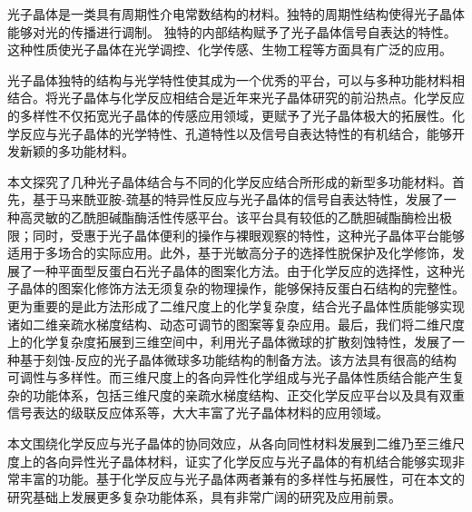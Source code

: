 \begin{cabstract}
  光子晶体是一类具有周期性介电常数结构的材料。独特的周期性结构使得光子晶体能够对光的传播进行调制。
  独特的内部结构赋予了光子晶体信号自表达的特性。这种性质使光子晶体在光学调控、化学传感、生物工程等方面具有广泛的应用。

  光子晶体独特的结构与光学特性使其成为一个优秀的平台，可以与多种功能材料相结合。将光子晶体与化学反应相结合是近年来光子晶体研究的前沿热点。化学反应的多样性不仅拓宽光子晶体的传感应用领域，更赋予了光子晶体极大的拓展性。化学反应与光子晶体的光学特性、孔道特性以及信号自表达特性的有机结合，能够开发新颖的多功能材料。

  本文探究了几种光子晶体结合与不同的化学反应结合所形成的新型多功能材料。首先，基于马来酰亚胺-巯基的特异性反应与光子晶体的信号自表达特性，发展了一种高灵敏的乙酰胆碱酯酶活性传感平台。该平台具有较低的乙酰胆碱酯酶检出极限；同时，受惠于光子晶体便利的操作与裸眼观察的特性，这种光子晶体平台能够适用于多场合的实际应用。此外，基于光敏高分子的选择性脱保护及化学修饰，发展了一种平面型反蛋白石光子晶体的图案化方法。由于化学反应的选择性，这种光子晶体的图案化修饰方法无须复杂的物理操作，能够保持反蛋白石结构的完整性。更为重要的是此方法形成了二维尺度上的化学复杂度，结合光子晶体性质能够实现诸如二维亲疏水梯度结构、动态可调节的图案等复杂应用。最后，我们将二维尺度上的化学复杂度拓展到三维空间中，利用光子晶体微球的扩散刻蚀特性，发展了一种基于刻蚀-反应的光子晶体微球多功能结构的制备方法。该方法具有很高的结构可调性与多样性。而三维尺度上的各向异性化学组成与光子晶体性质结合能产生复杂的功能体系，包括三维尺度的亲疏水梯度结构、正交化学反应平台以及具有双重信号表达的级联反应体系等，大大丰富了光子晶体材料的应用领域。

  本文围绕化学反应与光子晶体的协同效应，从各向同性材料发展到二维乃至三维尺度上的各向异性光子晶体材料，证实了化学反应与光子晶体的有机结合能够实现非常丰富的功能。基于化学反应与光子晶体两者兼有的多样性与拓展性，可在本文的研究基础上发展更多复杂功能体系，具有非常广阔的研究及应用前景。

\end{cabstract}


